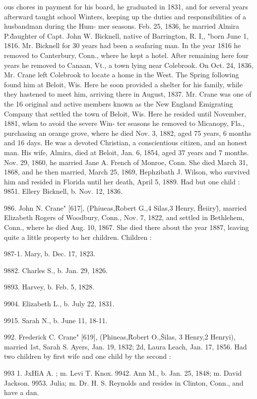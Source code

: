 ous chores in payment for his board, he graduated in 1831, and 
for several years afterward taught school Winters, keeping up 
the duties and responsibilities of a husbandman during the Hum- 
mer seasons. Feb. 25, 1836, he married Almira P.\^ daughter 
of Capt. John W. Bicknell, native of Barrington, R. I,, "born 
June 1, 1816. Mr. Bicknell for 30 years had been a seafaring 
man. In the year 1816 he removed to Canterbury, Conn., 
where he kept a hotel. After remaining here four years he 
removed to Canaan, Vt., a town lying near Colebrook. On 
Oct. 24, 1836, Mr. Crane left Colebrook to locate a home in the 
West. The Spring following found him at Beloit, Wis. Here 
he soon provided a shelter for his family, while they hastened to 
meet him, arriving there in August, 1837. Mr. Crane was one 
of the 16 original and active members known as the New England 
Emigrating Company that settled the town of Beloit, Wis. Here 
he resided until November, 1881, when to avoid the severe Win- 
ter seasons he removed to Micanopy, Fla., purchasing an orange 
grove, where he died Nov. 3, 1882, aged 75 years, 6 months and 
16 days. He was a devoted Christian, a conscientious citizen, 
and an honest man. His wife, Almira, died at Beloit, Jan. 6, 
1854, aged 37 years and 7 months. Nov. 29, 1860, he married 
Jane A. French of Monroe, Conn. She died March 31, 1868, 
and he then married, March 25, 1869, Hephzibath J. Wilson, 
who survived him and resided in Florida until her death, April 
5, 1889. Had but one child : 
9851. Ellery Bicknell, b. Nov. 12, 1836. 

986. John N. Crane" [617], (Phiueas,\^ Robert G.,4 Silas,3 
Henry, \^ Heiiry\^), married Elizabeth Rogers of Woodbury, Conn., 
Nov. 7, 1822, and settled in Bethlehem, Conn., where he died 
Aug. 10, 1867. She died there about the year 1887, leaving 
quite a little property to her children. Children : 

987-1. Mary, b. Dec. 17, 1823. 

9882. Charles S., b. Jan. 29, 1826. 

9893. Harvey, b. Feb. 5, 1828. 

9904. Elizabeth L., b. July 22, 1831. 

9915. Sarah N., b. June 11, 18-11. 

992. Frederick C. Crane" [619], (Phineas,\^ Robert O.,\^ 
Silas, 3 Henry,2 Henryi), married 1st, Sarah S. Ayers, Jan. 19, 
1832; 2d, Laura Leach, Jan. 17, 1856. Had two children by 
first wife and one child by the second : 

993  1. JxH\^iA A. ; m. Levi T. Knox. 
9942. Ann M., b. Jan. 25, 1848; m. David Jackson. 
9953. Julia; m. Dr. H. S. Reynolds and resides in Clinton, Conn., 
and have a dan. 

